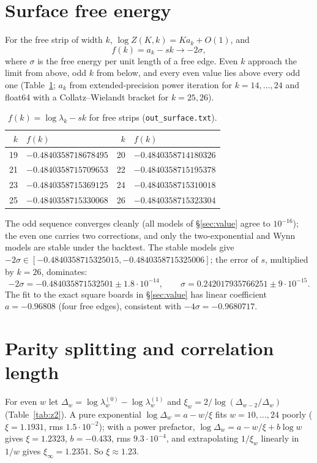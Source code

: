 \documentclass[11pt]{amsart}
\theoremstyle{definition}
\theoremstyle{remark}
\newcommand{\file}[1]{\texttt{#1}}
\begin{document}
\section{Surface free energy}\label{sec:surface}
For the free strip of width $k$, $\log Z(K, k) = K a_k + O(1)$, and
\[
  f(k) = a_k - s k \longrightarrow -2\sigma,
\]
where $\sigma$ is the free energy per unit length of a free edge. Even $k$ approach the limit from
above, odd $k$ from below, and every even value lies above every odd one (Table~\ref{tab:surface};
$a_k$ from extended-precision power iteration for $k = 14, \dots, 24$ and float64 with a
Collatz--Wielandt bracket for $k = 25, 26$).

\begin{table}[ht]
\caption{$f(k) = \log\lambda_k - sk$ for free strips (\file{out\_surface.txt}).}\label{tab:surface}
\begin{tabular}{rlrl}
\toprule
$k$ & $f(k)$ & $k$ & $f(k)$ \\
\midrule
19 & $-0.4840358718678495$ & 20 & $-0.4840358714180326$ \\
21 & $-0.4840358715709653$ & 22 & $-0.4840358715195378$ \\
23 & $-0.4840358715369125$ & 24 & $-0.4840358715310018$ \\
25 & $-0.4840358715330068$ & 26 & $-0.4840358715323304$ \\
\bottomrule
\end{tabular}
\end{table}

The odd sequence converges cleanly (all models of \S\ref{sec:value} agree to $10^{-16}$); the even
one carries two corrections, and only the two-exponential and Wynn models are stable under the
backtest. The stable models give $-2\sigma \in [-0.4840358715325015, -0.4840358715325006]$; the
error of $s$, multiplied by $k = 26$, dominates:
\[
  -2\sigma = -0.484035871532501 \pm 1.8\cdot10^{-14}, \qquad
  \sigma = 0.242017935766251 \pm 9\cdot10^{-15}.
\]
The fit to the exact square boards in \S\ref{sec:value} has linear coefficient $a = -0.96808$
(four free edges), consistent with $-4\sigma = -0.9680717$.

\section{Parity splitting and correlation length}\label{sec:z2}
For even $w$ let $\Delta_w = \log\lambda^{(0)}_w - \log\lambda^{(1)}_w$ and
$\xi_w = 2/\log(\Delta_{w-2}/\Delta_w)$ (Table~\ref{tab:z2}). A pure exponential
$\log\Delta_w = a - w/\xi$ fits $w = 10, \dots, 24$ poorly ($\xi = 1.1931$, rms $1.5\cdot10^{-2}$);
with a power prefactor, $\log\Delta_w = a - w/\xi + b\log w$ gives $\xi = 1.2323$, $b = -0.433$,
rms $9.3\cdot10^{-4}$, and extrapolating $1/\xi_w$ linearly in $1/w$ gives $\xi_\infty = 1.2351$.
So $\xi \approx 1.23$.
\end{document}
